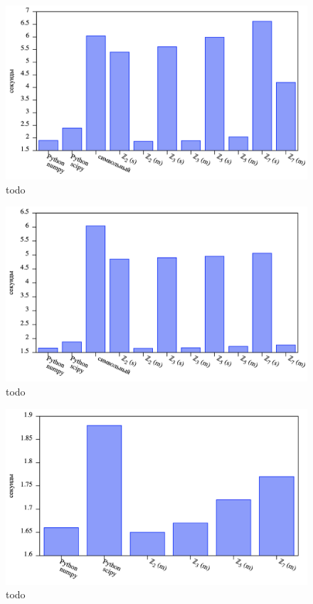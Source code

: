 \documentclass[master, och, diploma, times]{sty/SCWorks}
\theoremstyle{plain}
\theoremstyle{definition}
\begin{document}
\begin{figure}[H]
\centerline{\includegraphics[width=0.85\linewidth]{../gnuplot/comp/euler/plot.png}}
\caption{todo}
\end{figure}

\begin{figure}[H]
\centerline{\includegraphics[width=0.85\linewidth]{../gnuplot/comp/rk/plot.png}}
\caption{todo}
\end{figure}

\begin{figure}[H]
\centerline{\includegraphics[width=0.85\linewidth]{../gnuplot/comp/rk/multi.png}}
\caption{todo}
\end{figure}
\end{document}
